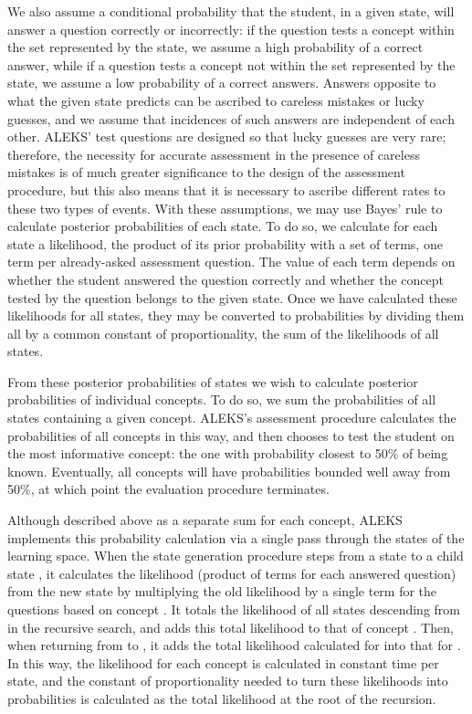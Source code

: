 \documentclass[11pt]{llncs}
\begin{document}
{We also assume a conditional probability that the student, in a given state, will answer a question correctly or incorrectly: if the question tests a concept within the set represented by the state, we assume a high probability of a correct answer, while if a question tests a concept not within the set represented by the state, we assume a low probability of a correct answers.
Answers opposite to what the given state predicts can be ascribed to careless mistakes or lucky guesses, and we assume that incidences of such answers are independent of each other. ALEKS' test questions are designed so that lucky guesses are very rare; therefore, the necessity for accurate assessment in the presence of careless mistakes is of much greater significance to the design of the assessment procedure, but this also means that it is necessary to ascribe different rates to these two types of events. With these assumptions, we may use Bayes' rule to calculate posterior probabilities of each state. To do so, we calculate for each state a likelihood, the product of its prior probability with a set of terms, one term per already-asked assessment question. The value of each term depends on whether the student answered the question correctly and whether the concept tested by the question belongs to the given state. Once we have calculated these likelihoods for all states, they may be converted to probabilities by dividing them all by a common constant of proportionality, the sum of the likelihoods of all states.

From these posterior probabilities of states we wish to calculate posterior probabilities of individual concepts. To do so, we sum the probabilities of all states containing a given concept. ALEKS's assessment procedure calculates the probabilities of all concepts in this way, and then chooses to test the student on the most informative concept: the one with probability closest to 50\% of being known. Eventually, all concepts will have probabilities bounded well away from 50\%, at which point the evaluation procedure terminates.

Although described above as a separate sum for each concept,
ALEKS implements this probability calculation via a single pass through the states of the learning space. When the state generation procedure steps from a state  to a child state , it calculates the likelihood (product of terms for each answered question) from the new state by multiplying the old likelihood by a single term for the questions based on concept . It totals the likelihood of all states descending from  in the recursive search, and adds this total likelihood to that of concept . Then, when returning from  to , it adds the total likelihood calculated for  into that for . In this way, the likelihood for each concept is calculated in constant time per state, and the constant of proportionality needed to turn these likelihoods into probabilities is calculated as the total likelihood at the root of the recursion.

}
\end{document}
